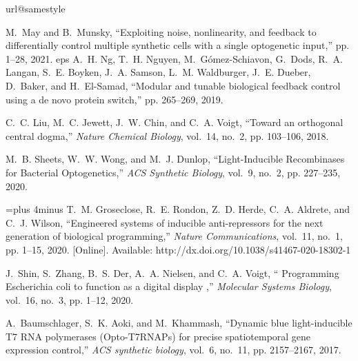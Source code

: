\documentclass[12pt]{iopart}
\begin{document}
\begin{thebibliography}{10}
\providecommand{\url}[1]{#1}
\csname url@samestyle\endcsname
\providecommand{\newblock}{\relax}
\providecommand{\bibinfo}[2]{#2}
\providecommand{\BIBentrySTDinterwordspacing}{\spaceskip=0pt\relax}
\providecommand{\BIBentryALTinterwordstretchfactor}{4}
\providecommand{\BIBentryALTinterwordspacing}{\spaceskip=\fontdimen2\font plus
\BIBentryALTinterwordstretchfactor\fontdimen3\font minus
  \fontdimen4\font\relax}
\providecommand{\BIBforeignlanguage}[2]{{%
\expandafter\ifx\csname l@#1\endcsname\relax
\typeout{** WARNING: IEEEtran.bst: No hyphenation pattern has been}%
\typeout{** loaded for the language `#1'. Using the pattern for}%
\typeout{** the default language instead.}%
\else
\language=\csname l@#1\endcsname
\fi
#2}}
\providecommand{\BIBdecl}{\relax}
\BIBdecl

M.~May and B.~Munsky, ``{Exploiting noise, nonlinearity, and feedback to
  differentially control multiple synthetic cells with a single optogenetic
  input},'' pp. 1--28, 2021.
eps
A.~H. Ng, T.~H. Nguyen, M.~G{\'{o}}mez-Schiavon, G.~Dods, R.~A. Langan, S.~E.
  Boyken, J.~A. Samson, L.~M. Waldburger, J.~E. Dueber, D.~Baker, and
  H.~El-Samad, ``{Modular and tunable biological feedback control using a de
  novo protein switch},'' pp. 265--269, 2019.

C.~C. Liu, M.~C. Jewett, J.~W. Chin, and C.~A. Voigt, ``{Toward an orthogonal
  central dogma},'' \emph{Nature Chemical Biology}, vol.~14, no.~2, pp.
  103--106, 2018.

M.~B. Sheets, W.~W. Wong, and M.~J. Dunlop, ``{Light-Inducible Recombinases for
  Bacterial Optogenetics},'' \emph{ACS Synthetic Biology}, vol.~9, no.~2, pp.
  227--235, 2020.

\BIBentryALTinterwordspacing
T.~M. Groseclose, R.~E. Rondon, Z.~D. Herde, C.~A. Aldrete, and C.~J. Wilson,
  ``{Engineered systems of inducible anti-repressors for the next generation of
  biological programming},'' \emph{Nature Communications}, vol.~11, no.~1, pp.
  1--15, 2020. [Online]. Available:
  \url{http://dx.doi.org/10.1038/s41467-020-18302-1}
\BIBentrySTDinterwordspacing

J.~Shin, S.~Zhang, B.~S. Der, A.~A. Nielsen, and C.~A. Voigt, ``{ Programming
  Escherichia coli to function as a digital display },'' \emph{Molecular
  Systems Biology}, vol.~16, no.~3, pp. 1--12, 2020.

A.~Baumschlager, S.~K. Aoki, and M.~Khammash, ``{Dynamic blue light-inducible
  T7 RNA polymerases (Opto-T7RNAPs) for precise spatiotemporal gene expression
  control},'' \emph{ACS synthetic biology}, vol.~6, no.~11, pp. 2157--2167,
  2017.


\end{thebibliography}
\end{document}
